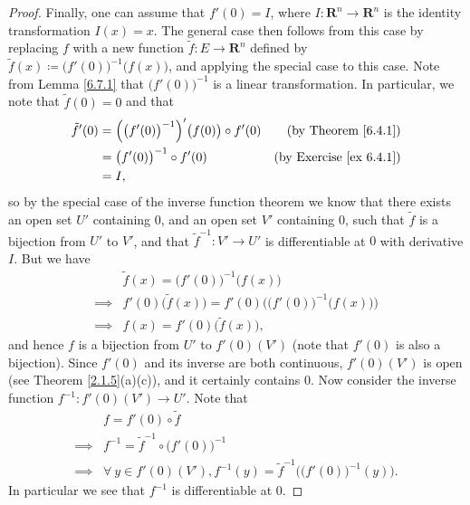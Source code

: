 \begin{proof}
    Finally, one can assume that \(f'(0) = I\), where \(I : \mathbf{R}^n \to \mathbf{R}^n\) is the identity transformation \(I(x) = x\).
    The general case then follows from this case by replacing \(f\) with a new function \(\tilde{f} : E \to \mathbf{R}^n\) defined by \(\tilde{f}(x) \coloneqq \big(f'(0)\big)^{-1} \big(f(x)\big)\), and applying the special case to this case.
    Note from Lemma \ref{6.7.1} that \(\big(f'(0)\big)^{-1}\) is a linear transformation.
    In particular, we note that \(\tilde{f}(0) = 0\) and that
    \begin{align*}
        \tilde{f}'(0) & = \Big(\big(f'(0)\big)^{-1}\Big)'\big(f(0)\big) \circ f'(0) & \text{(by Theorem \ref{6.4.1})}     \\
                      & = \big(f'(0)\big)^{-1} \circ f'(0)                          & \text{(by Exercise \ref{ex 6.4.1})} \\
                      & = I,
    \end{align*}
    so by the special case of the inverse function theorem we know that there exists an open set \(U'\) containing \(0\), and an open set \(V'\) containing \(0\), such that \(\tilde{f}\) is a bijection from \(U'\) to \(V'\), and that \(\tilde{f}^{-1} : V' \to U'\) is differentiable at \(0\) with derivative \(I\).
    But we have
    \begin{align*}
                 & \tilde{f}(x) = \big(f'(0)\big)^{-1} \big(f(x)\big)                                 \\
        \implies & f'(0) \big(\tilde{f}(x)\big) = f'(0) \Big(\big(f'(0)\big)^{-1} \big(f(x)\big)\Big) \\
        \implies & f(x) = f'(0) \big(\tilde{f}(x)\big),
    \end{align*}
    and hence \(f\) is a bijection from \(U'\) to \(f'(0)(V')\)
    (note that \(f'(0)\) is also a bijection).
    Since \(f'(0)\) and its inverse are both continuous, \(f'(0)(V')\) is open (see Theorem \ref{2.1.5}(a)(c)), and it certainly contains \(0\).
    Now consider the inverse function \(f^{-1} : f'(0)(V') \to U'\).
    Note that
    \begin{align*}
                 & f = f'(0) \circ \tilde{f}                                                              \\
        \implies & f^{-1} = \tilde{f}^{-1} \circ \big(f'(0)\big)^{-1}                                     \\
        \implies & \forall\ y \in f'(0)(V'), f^{-1}(y) = \tilde{f}^{-1}\Big(\big(f'(0)\big)^{-1}(y)\Big).
    \end{align*}
    In particular we see that \(f^{-1}\) is differentiable at \(0\).


\end{proof}
